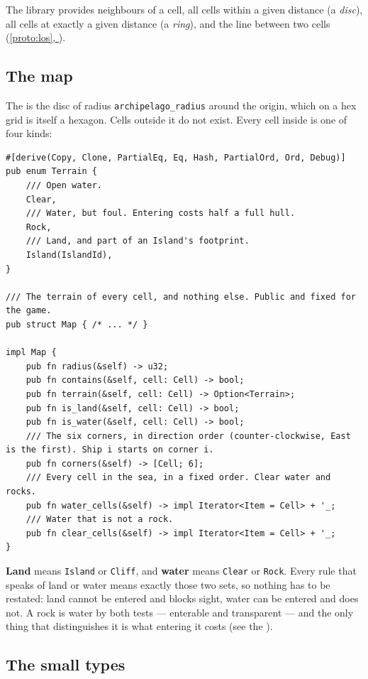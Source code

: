 \documentclass{article}
\newcommand{\fullref}[1]{\hyperref[#1]{\cref*{#1}, \nameref*{#1}}}
\begin{document}
The library provides neighbours of a cell, all cells within a given distance (a \emph{disc}), all
cells at exactly a given distance (a \emph{ring}), and the line between two cells
(\fullref{proto:los}).

\subsection{The map}
\label{proto:map}

The \archipelago{} is the disc of radius \texttt{archipelago\_radius} around the origin, which on
a hex grid is itself a hexagon. Cells outside it do not exist. Every cell inside is one of four
kinds:

\begin{lstlisting}
#[derive(Copy, Clone, PartialEq, Eq, Hash, PartialOrd, Ord, Debug)]
pub enum Terrain {
    /// Open water.
    Clear,
    /// Water, but foul. Entering costs half a full hull.
    Rock,
    /// Land, and part of an Island's footprint.
    Island(IslandId),
}

/// The terrain of every cell, and nothing else. Public and fixed for the game.
pub struct Map { /* ... */ }

impl Map {
    pub fn radius(&self) -> u32;
    pub fn contains(&self, cell: Cell) -> bool;
    pub fn terrain(&self, cell: Cell) -> Option<Terrain>;
    pub fn is_land(&self, cell: Cell) -> bool;
    pub fn is_water(&self, cell: Cell) -> bool;
    /// The six corners, in direction order (counter-clockwise, East is the first). Ship i starts on corner i.
    pub fn corners(&self) -> [Cell; 6];
    /// Every cell in the sea, in a fixed order. Clear water and rocks.
    pub fn water_cells(&self) -> impl Iterator<Item = Cell> + '_;
    /// Water that is not a rock.
    pub fn clear_cells(&self) -> impl Iterator<Item = Cell> + '_;
}
\end{lstlisting}

\textbf{Land} means \texttt{Island} or \texttt{Cliff}, and \textbf{water} means \texttt{Clear} or
\texttt{Rock}. Every rule that speaks of land or water means exactly those two sets, so nothing
has to be restated: land cannot be entered and blocks sight, water can be entered and does not. A
rock is water by both tests --- enterable and transparent --- and the only thing that
distinguishes it is what entering it costs (see the \MD).

\subsection{The small types}
\label{proto:types}
\end{document}
